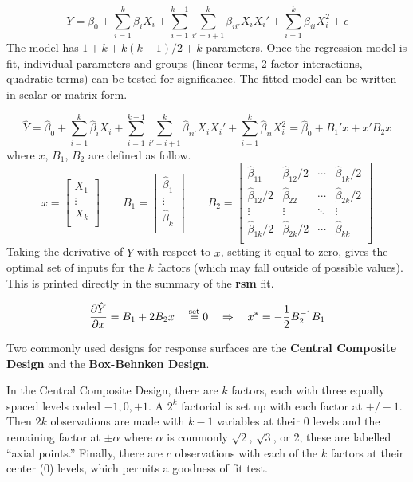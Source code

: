 \documentclass[
]{book}
\begin{document}
\[
Y = \beta_0 + \sum_{i=1}^k \beta_{i}X_i + \sum_{i=1}^{k-1}\sum_{i'=i+1}^k\beta_{ii'}X_iX_i'
+ \sum_{i=1}^k\beta_{ii}X_i^2 + \epsilon
\] The model has \(1+k+k(k-1)/2+k\) parameters. Once the regression
model is fit, individual parameters and groups (linear terms, 2-factor
interactions, quadratic terms) can be tested for significance. The
fitted model can be written in scalar or matrix form.

\[
\hat{Y}=\hat{\beta}_0 + \sum_{i=1}^k \hat{\beta}_{i}X_i + \sum_{i=1}^{k-1}\sum_{i'=i+1}^k\hat{\beta}_{ii'}X_iX_i'
+ \sum_{i=1}^k\hat{\beta}_{ii}X_i^2 =
\hat{\beta}_0+ B_1'x + x'B_2x
\] where \(x\), \(B_1\), \(B_2\) are defined as follow. \[
x=\begin{bmatrix}
X_1 \\ \vdots \\ X_k \\
\end{bmatrix}
\qquad
B_1 =
\begin{bmatrix}
\hat{\beta}_1 \\ \vdots \\ \hat{\beta}_k\\
\end{bmatrix}
\qquad
B_2 = 
\begin{bmatrix}
\hat{\beta}_{11} & \hat{\beta}_{12}/2 & \cdots & \hat{\beta}_{1k}/2 \\
\hat{\beta}_{12}/2 & \hat{\beta}_{22} & \cdots & \hat{\beta}_{2k}/2 \\
\vdots & \vdots & \ddots & \vdots \\
\hat{\beta}_{1k}/2 & \hat{\beta}_{2k}/2 & \cdots & \hat{\beta}_{kk}\\
\end{bmatrix}
\] Taking the derivative of \(\hat{Y}\) with respect to \(x\), setting
it equal to zero, gives the optimal set of inputs for the \(k\) factors
(which may fall outside of possible values). This is printed directly in
the summary of the \textbf{rsm} fit.

\[
\frac{\partial \hat{Y}}{\partial x}= B_1 + 2B_2x \quad \stackrel{\rm set}{=}0 \quad
\Rightarrow \quad x^* = -\frac{1}{2}B_2^{-1}B_1
\]

Two commonly used designs for response surfaces are the \textbf{Central
Composite Design} and the \textbf{Box-Behnken Design}.

In the Central Composite Design, there are \(k\) factors, each with
three equally spaced levels coded \(-1,0,+1\). A \(2^k\) factorial is
set up with each factor at \(+/-1\). Then \(2k\) observations are made
with \(k-1\) variables at their 0 levels and the remaining factor at
\(\pm \alpha\) where \(\alpha\) is commonly \(\sqrt{2}\), \(\sqrt{3}\),
or 2, these are labelled ``axial points.'' Finally, there are \(c\)
observations with each of the \(k\) factors at their center (0) levels,
which permits a goodness of fit test.
\end{document}
